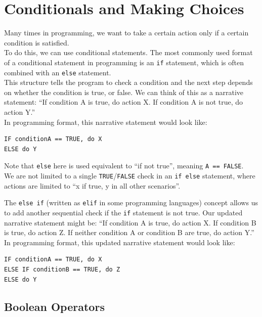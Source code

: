 \documentclass[
]{book}
\begin{document}
\chapter{Conditionals and Making Choices}\label{conditionals-and-making-choices}

Many times in programming, we want to take a certain action only if a certain condition is satisfied.\\

To do this, we can use conditional statements. The most commonly used format of a conditional statement in programming is an \texttt{if} statement, which is often combined with an \texttt{else} statement.\\

This structure tells the program to check a condition and the next step depends on whether the condition is true, or false. We can think of this as a narrative statement: ``If condition A is true, do action X. If condition A is not true, do action Y.''\\

In programming format, this narrative statement would look like:

\begin{verbatim}
IF conditionA == TRUE, do X
ELSE do Y
\end{verbatim}

Note that \texttt{else} here is used equivalent to ``if not true'', meaning \texttt{A\ ==\ FALSE}.\\

We are not limited to a single \texttt{TRUE}/\texttt{FALSE} check in an \texttt{if\ else} statement, where actions are limited to ``x if true, y in all other scenarios''.

The \texttt{else\ if} (written as \texttt{elif} in some programming languages) concept allows us to add another sequential check if the \texttt{if} statement is not true. Our updated narrative statement might be: ``If condition A is true, do action X. If condition B is true, do action Z. If neither condition A or condition B are true, do action Y.''\\

In programming format, this updated narrative statement would look like:

\begin{verbatim}
IF conditionA == TRUE, do X
ELSE IF conditionB == TRUE, do Z
ELSE do Y
\end{verbatim}

\section{Boolean Operators}\label{boolean-operators}
\end{document}
